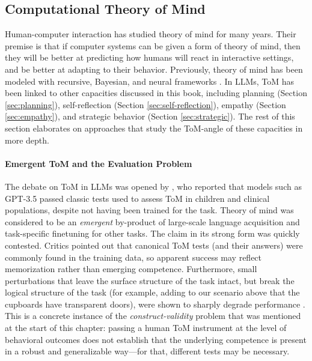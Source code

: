 \subsection{Computational Theory of Mind}
Human-computer interaction has studied theory of mind for many years. Their premise is that if computer systems can be given a form of theory of mind, then they will be better at predicting  how humans will react in interactive settings, and be better at adapting to their behavior. Previously, theory of mind has been modeled with recursive, Bayesian, and neural frameworks \citep{deweerd2017negotiating, baker2011bayesian, pmlr-v80-rabinowitz18a}. In LLMs, ToM has been linked to other capacities discussed in this book, including planning (Section \ref{sec:planning}), self-reflection (Section \ref{sec:self-reflection}), empathy (Section \ref{sec:empathy}), and strategic behavior (Section \ref{sec:strategic}). 
The rest of this section elaborates on approaches that study the ToM-angle of these capacities in more depth. 

\paragraph{Emergent ToM and the Evaluation Problem}
The debate on ToM in LLMs was opened by \citet{kosinski2023theory, kosinski2024evaluating}, who reported that models such as GPT-3.5 passed classic tests used to assess ToM in children and clinical populations, despite not having been trained for the task. Theory of mind was considered  to be  an \emph{emergent} by-product of large-scale language acquisition and task-specific finetuning for other tasks. The claim in its strong form was quickly contested. Critics pointed out that canonical ToM tests (and their answers) were  commonly found in the training data, so apparent success may reflect memorization rather than  emerging competence. Furthermore, small perturbations that leave the surface structure of the task intact, but break the logical structure of the task (for example, adding to our scenario above that the cupboards have transparent doors), were shown to sharply degrade performance \citep{ullman2023large, shapira2023clever, kim-etal-2023-fantom}. This is a concrete instance of the \emph{construct-validity} problem that was mentioned at the start of this chapter: passing a human ToM instrument at the level of behavioral outcomes does not establish that the underlying competence is present in a robust and generalizable way---for that, different tests may be necessary.

